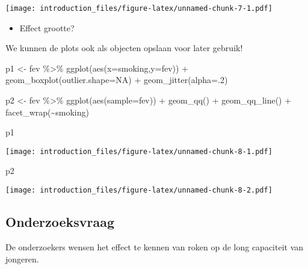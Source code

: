 \documentclass[
]{article}
\newenvironment{Shaded}{\begin{snugshade}}{\end{snugshade}}
\newcommand{\AttributeTok}[1]{\textcolor[rgb]{0.77,0.63,0.00}{#1}}
\newcommand{\ConstantTok}[1]{\textcolor[rgb]{0.00,0.00,0.00}{#1}}
\newcommand{\DecValTok}[1]{\textcolor[rgb]{0.00,0.00,0.81}{#1}}
\newcommand{\FunctionTok}[1]{\textcolor[rgb]{0.00,0.00,0.00}{#1}}
\newcommand{\NormalTok}[1]{#1}
\newcommand{\OtherTok}[1]{\textcolor[rgb]{0.56,0.35,0.01}{#1}}
\newcommand{\SpecialCharTok}[1]{\textcolor[rgb]{0.00,0.00,0.00}{#1}}
\providecommand{\tightlist}{%
  \setlength{\itemsep}{0pt}\setlength{\parskip}{0pt}}
\begin{document}
\texttt{[image: introduction\_files/figure-latex/unnamed-chunk-7-1.pdf]}

\begin{itemize}
\tightlist
\item
  Effect grootte?
\end{itemize}

We kunnen de plots ook als objecten opslaan voor later gebruik!

\begin{Shaded}
\begin{Highlighting}[]
\NormalTok{p1 }\OtherTok{\textless{}{-}}\NormalTok{ fev }\SpecialCharTok{\%\textgreater{}\%}
  \FunctionTok{ggplot}\NormalTok{(}\FunctionTok{aes}\NormalTok{(}\AttributeTok{x=}\NormalTok{smoking,}\AttributeTok{y=}\NormalTok{fev)) }\SpecialCharTok{+}
  \FunctionTok{geom\_boxplot}\NormalTok{(}\AttributeTok{outlier.shape=}\ConstantTok{NA}\NormalTok{) }\SpecialCharTok{+}
  \FunctionTok{geom\_jitter}\NormalTok{(}\AttributeTok{alpha=}\NormalTok{.}\DecValTok{2}\NormalTok{)}

\NormalTok{p2 }\OtherTok{\textless{}{-}}\NormalTok{ fev }\SpecialCharTok{\%\textgreater{}\%}
  \FunctionTok{ggplot}\NormalTok{(}\FunctionTok{aes}\NormalTok{(}\AttributeTok{sample=}\NormalTok{fev)) }\SpecialCharTok{+}
  \FunctionTok{geom\_qq}\NormalTok{() }\SpecialCharTok{+}
  \FunctionTok{geom\_qq\_line}\NormalTok{() }\SpecialCharTok{+}
  \FunctionTok{facet\_wrap}\NormalTok{(}\SpecialCharTok{\textasciitilde{}}\NormalTok{smoking)}

\NormalTok{p1}
\end{Highlighting}
\end{Shaded}

\texttt{[image: introduction\_files/figure-latex/unnamed-chunk-8-1.pdf]}

\begin{Shaded}
\begin{Highlighting}[]
\NormalTok{p2}
\end{Highlighting}
\end{Shaded}

\texttt{[image: introduction\_files/figure-latex/unnamed-chunk-8-2.pdf]}

\hypertarget{onderzoeksvraag}{%
\subsection{Onderzoeksvraag}\label{onderzoeksvraag}}

De onderzoekers wensen het effect te kennen van roken op de long
capaciteit van jongeren.
\end{document}
